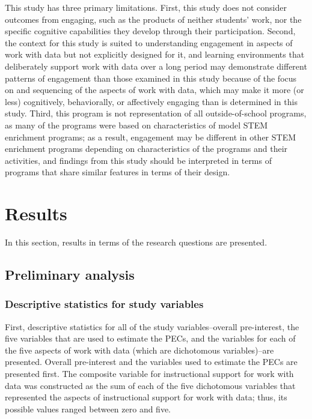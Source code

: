 \documentclass[]{msu-thesis}
\theoremstyle{definition}
\theoremstyle{definition}
\theoremstyle{definition}
\theoremstyle{remark}
\begin{document}
This study has three primary limitations. First, this study does not
consider outcomes from engaging, such as the products of neither
students' work, nor the specific cognitive capabilities they develop
through their participation. Second, the context for this study is
suited to understanding engagement in aspects of work with data but not
explicitly designed for it, and learning environments that deliberately
support work with data over a long period may demonstrate different
patterns of engagement than those examined in this study because of the
focus on and sequencing of the aspects of work with data, which may make
it more (or less) cognitively, behaviorally, or affectively engaging
than is determined in this study. Third, this program is not
representation of all outside-of-school programs, as many of the
programs were based on characteristics of model STEM enrichment
programs; as a result, engagement may be different in other STEM
enrichment programs depending on characteristics of the programs and
their activities, and findings from this study should be interpreted in
terms of programs that share similar features in terms of their design.

\chapter{Results}\label{results}

In this section, results in terms of the research questions are
presented.

\section{Preliminary analysis}\label{preliminary-analysis}

\subsection{Descriptive statistics for study
variables}\label{descriptive-statistics-for-study-variables}

First, descriptive statistics for all of the study variables--overall
pre-interest, the five variables that are used to estimate the PECs, and
the variables for each of the five aspects of work with data (which are
dichotomous variables)--are presented. Overall pre-interest and the
variables used to estimate the PECs are presented first. The composite
variable for instructional support for work with data was constructed as
the sum of each of the five dichotomous variables that represented the
aspects of instructional support for work with data; thus, its possible
values ranged between zero and five.
\end{document}

